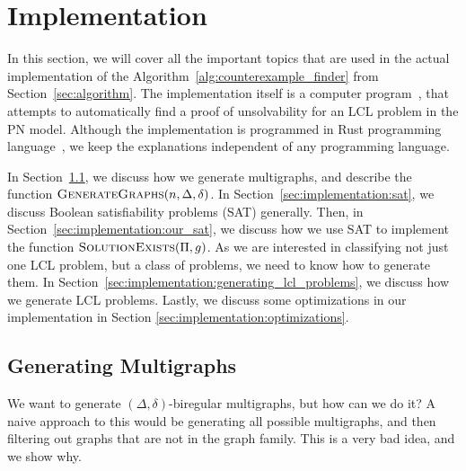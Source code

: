 
\section{Implementation} \label{sec:implementation}
In this section, we will cover all the important topics that are used in the actual implementation of the Algorithm~\ref{alg:counterexample_finder} from Section~\ref{sec:algorithm}.
The implementation itself is a computer program~\cite{NonconstantLclClassifier2022}, that attempts to automatically find a proof of unsolvability for an LCL problem in the PN model.
Although the implementation is programmed in Rust programming language~\cite{RustLang}, we keep the explanations independent of any programming language.

In Section~\ref{sec:implementation:generating_multigraphs}, we discuss how we generate multigraphs, and describe the function $\textsc{GenerateGraphs}(n, \Delta, \delta)$.
In Section~\ref{sec:implementation:sat}, we discuss Boolean satisfiability problems (SAT) generally.
Then, in Section~\ref{sec:implementation:our_sat}, we discuss how we use SAT to implement the function $\textsc{SolutionExists}(\Pi, g)$.
As we are interested in classifying not just one LCL problem, but a class of problems, we need to know how to generate them.
In Section~\ref{sec:implementation:generating_lcl_problems}, we discuss how we generate LCL problems.
Lastly, we discuss some optimizations in our implementation in Section \ref{sec:implementation:optimizations}.


\subsection{Generating Multigraphs} \label{sec:implementation:generating_multigraphs}
We want to generate $(\Delta, \delta)$-biregular multigraphs, but how can we do it?
A naive approach to this would be generating all possible multigraphs, and then filtering out graphs that are not in the graph family.
This is a very bad idea, and we show why.

